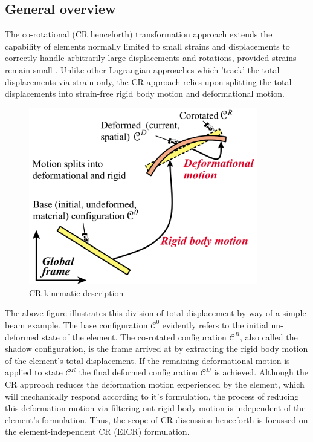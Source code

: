\subsection{General overview}
The co-rotational (CR henceforth) transformation approach extends the capability of elements normally limited to small strains and  displacements to correctly handle arbitrarily large displacements and rotations, provided strains remain small \cite{FelippaCR1_2016}. Unlike other Lagrangian approaches which 'track' the total displacements via strain only, the CR approach relies upon splitting the total displacements into strain-free rigid body motion and deformational motion.

\begin{figure}[H]
	\centering
	\def\svgwidth{\columnwidth}
	\includegraphics[width=10cm]{images/cr_1.png}
	\caption{CR kinematic description \cite{FelippaCR1_2016}}
	\label{cr1}
\end{figure}

The above figure illustrates this division of total displacement by way of a simple beam example. The base configuration $\mathscr{C}^0$ evidently refers to the initial un-deformed state of the element. The co-rotated configuration $\mathscr{C}^R$, also called the shadow configuration, is the frame arrived at by extracting the rigid body motion of the element's total displacement. If the remaining deformational motion is applied to state $\mathscr{C}^R$ the final deformed configuration $\mathscr{C}^D$ is achieved. Although the CR approach reduces the deformation motion experienced by the element, which will mechanically respond according to it's formulation, the process of reducing this deformation motion via filtering out rigid body motion is independent of the element's formulation. Thus, the scope of CR discussion henceforth is focussed on the element-independent CR (EICR) formulation.

